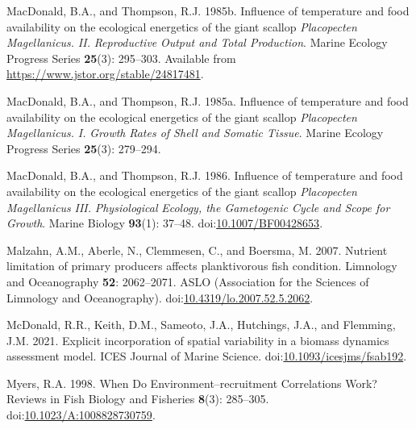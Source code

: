 \documentclass[
]{article}
\newlength{\cslhangindent}
\newlength{\cslentryspacingunit} %
\newenvironment{CSLReferences}[2] %
 {%
  \setlength{\parindent}{0pt}
  \ifodd #1
  \let\oldpar\par
  \def\par{\hangindent=\cslhangindent\oldpar}
  \fi
  \setlength{\parskip}{#2\cslentryspacingunit}
 }%
 {}
\begin{document}
\begin{CSLReferences}{1}{0}
\leavevmode{}%
MacDonald, B.A., and Thompson, R.J. 1985b. Influence of temperature and food availability on the ecological energetics of the giant scallop {\emph{Placopecten}}{ \emph{Magellanicus}}{\emph{\emph{.}} }{\emph{\emph{II}}}{\emph{\emph{.}} }{\emph{\emph{Reproductive}}}{ \emph{\emph{Output and Total Production}}}. Marine Ecology Progress Series \textbf{25}(3): 295--303. Available from \url{https://www.jstor.org/stable/24817481}.

\leavevmode{}%
MacDonald, B.A., and Thompson, R.J. 1985a. Influence of temperature and food availability on the ecological energetics of the giant scallop {\emph{Placopecten}}{ \emph{Magellanicus}}{\emph{\emph{.}} }{\emph{\emph{I}}}{\emph{\emph{.}} }{\emph{\emph{Growth}}}{ \emph{\emph{Rates of Shell and Somatic Tissue}}}. Marine Ecology Progress Series \textbf{25}(3): 279--294.

\leavevmode{}%
MacDonald, B.A., and Thompson, R.J. 1986. Influence of temperature and food availability on the ecological energetics of the giant scallop {\emph{Placopecten}}{ \emph{Magellanicus}}{ \emph{\emph{}} }{\emph{\emph{III}}}{\emph{\emph{.}} }{\emph{\emph{Physiological}}}{ \emph{\emph{Ecology, the Gametogenic Cycle and Scope for Growth}}}. Marine Biology \textbf{93}(1): 37--48. doi:\href{https://doi.org/10.1007/BF00428653}{10.1007/BF00428653}.

\leavevmode{}%
Malzahn, A.M., Aberle, N., Clemmesen, C., and Boersma, M. 2007. Nutrient limitation of primary producers affects planktivorous fish condition. Limnology and Oceanography \textbf{52}: 2062--2071. {ASLO (Association for the Sciences of Limnology and Oceanography)}. doi:\href{https://doi.org/10.4319/lo.2007.52.5.2062}{10.4319/lo.2007.52.5.2062}.

\leavevmode{}%
McDonald, R.R., Keith, D.M., Sameoto, J.A., Hutchings, J.A., and Flemming, J.M. 2021. Explicit incorporation of spatial variability in a biomass dynamics assessment model. ICES Journal of Marine Science. doi:\href{https://doi.org/10.1093/icesjms/fsab192}{10.1093/icesjms/fsab192}.

\leavevmode{}%
Myers, R.A. 1998. When {Do Environment}--recruitment {Correlations Work}? Reviews in Fish Biology and Fisheries \textbf{8}(3): 285--305. doi:\href{https://doi.org/10.1023/A:1008828730759}{10.1023/A:1008828730759}.


\end{CSLReferences}
\end{document}
